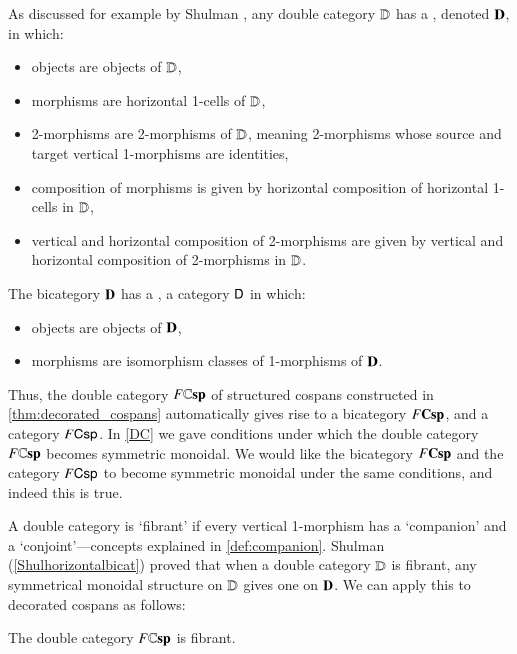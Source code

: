 \documentclass[reqno]{amsart}
\begin{document}
As discussed for example by Shulman \cite{Shulman2010}, any double category $\mathbf{\mathbb D}$ has a 
, denoted $\mathbf{D}$, in which:
\begin{itemize}
\item objects are objects of $\mathbf{\mathbb D}$,
\item morphisms are horizontal 1-cells of $\mathbf{\mathbb D}$,
\item 2-morphisms are  2-morphisms of $\mathbf{\mathbb D}$, meaning 2-morphisms whose source and target vertical 1-morphisms are identities,
\item composition of morphisms is given by horizontal composition of horizontal 1-cells in $\mathbf{\mathbb D}$,
\item vertical and horizontal composition of 2-morphisms are given by vertical and horizontal
composition of 2-morphisms in $\mathbf{\mathbb D}$.
\end{itemize}
The bicategory $\mathbf{D}$ has a , a category $\mathsf{D}$ in which:
\begin{itemize}
\item objects are objects of $\mathbf{D}$,
\item morphisms are isomorphism classes of 1-morphisms of $\mathbf{D}$.   
\end{itemize}
Thus, the double category $F\mathbf{\mathbb Csp}$ of structured cospans constructed in \cref{thm:decorated_cospans} automatically gives rise to a bicategory $F\mathbf{Csp}$, and a category $F\mathsf{Csp}$.   In \cref{DC} we gave conditions under which the double category $F\mathbf{\mathbb Csp}$ becomes symmetric monoidal.   We would like the bicategory $F\mathbf{Csp}$ and the category $F\mathsf{Csp}$ to become symmetric monoidal under the same conditions, and indeed this is true.   

A double category is `fibrant' if every vertical 1-morphism has a `companion' and a `conjoint'---concepts explained in \cref{def:companion}. Shulman (\cref{Shulhorizontalbicat}) proved that when a double category $\mathbf{\mathbb D}$ is fibrant, any symmetrical monoidal structure on $\mathbf{\mathbb D}$ gives one on $\mathbf{D}$.    We can apply this to decorated cospans as follows:

\begin{lem}
The double category $F\mathbf{\mathbb Csp}$ is fibrant.
\end{lem}
\end{document}
